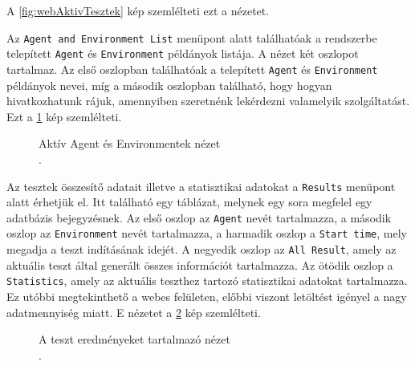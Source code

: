 A \ref{fig:webAktivTesztek} kép szemlélteti ezt a nézetet.

Az \texttt{Agent and Environment List} menüpont alatt találhatóak a rendszerbe telepített \texttt{Agent} és \texttt{Environment} példányok listája. A nézet két oszlopot tartalmaz. Az első oszlopban találhatóak a telepített \texttt{Agent} és \texttt{Environment} példányok nevei, míg a második oszlopban található, hogy hogyan hivatkozhatunk rájuk, amennyiben szeretnénk lekérdezni valamelyik szolgáltatást. Ezt a \ref{fig:webAktivBatyuk} kép szemlélteti.

\begin{figure}[h!]
  \centering
  \caption[Aktív Agent és Environmentek nézet]%
  {Aktív Agent és Environmentek nézet\\
  {\white .}\hfill\url{}}
  \label{fig:webAktivBatyuk}
\end{figure}

Az tesztek összesítő adatait illetve a statisztikai adatokat a \texttt{Results} menüpont alatt érhetjük el. Itt található egy táblázat, melynek egy sora megfelel egy adatbázis bejegyzésnek. Az első oszlop az \texttt{Agent} nevét tartalmazza, a második oszlop az \texttt{Environment} nevét tartalmazza, a harmadik oszlop a \texttt{Start time}, mely megadja a teszt indításának idejét. A negyedik oszlop az \texttt{All Result}, amely az aktuális teszt által generált összes információt tartalmazza. Az ötödik oszlop a \texttt{Statistics}, amely az aktuális teszthez tartozó statisztikai adatokat tartalmazza. Ez utóbbi megtekinthető a webes felületen, előbbi viszont letöltést igényel a nagy adatmennyiség miatt. E nézetet a \ref{fig:webResults} kép szemlélteti.

\begin{figure}[h!]
  \centering
  \caption[A teszt eredményeket tartalmazó nézet]%
  {A teszt eredményeket tartalmazó nézet\\
  {\white .}\hfill\url{}}
  \label{fig:webResults}
\end{figure}




